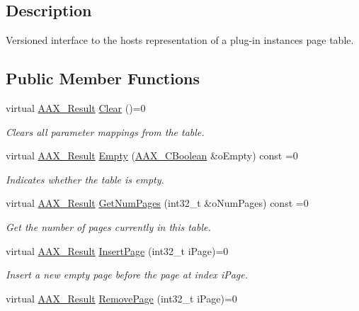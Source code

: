 \subsection{Description}
Versioned interface to the host\textquotesingle{}s representation of a plug-\/in instance\textquotesingle{}s page table. \subsection*{Public Member Functions}
\begin{DoxyCompactItemize}
\item 
virtual \mbox{\hyperlink{a00392_a4d8f69a697df7f70c3a8e9b8ee130d2f}{A\+A\+X\+\_\+\+Result}} \mbox{\hyperlink{a01725_a664fd7f2edd4f258f258541c85cf3a30}{Clear}} ()=0
\begin{DoxyCompactList}\small\item\em Clears all parameter mappings from the table. \end{DoxyCompactList}\item 
virtual \mbox{\hyperlink{a00392_a4d8f69a697df7f70c3a8e9b8ee130d2f}{A\+A\+X\+\_\+\+Result}} \mbox{\hyperlink{a01725_ac76672810be58fb013c193ba50170f53}{Empty}} (\mbox{\hyperlink{a00392_aa216506530f1d19a2965931ced2b274b}{A\+A\+X\+\_\+\+C\+Boolean}} \&o\+Empty) const =0
\begin{DoxyCompactList}\small\item\em Indicates whether the table is empty. \end{DoxyCompactList}\item 
virtual \mbox{\hyperlink{a00392_a4d8f69a697df7f70c3a8e9b8ee130d2f}{A\+A\+X\+\_\+\+Result}} \mbox{\hyperlink{a01725_a8c86b0cfe2d9cfe8b745c09ccf2d8619}{Get\+Num\+Pages}} (int32\+\_\+t \&o\+Num\+Pages) const =0
\begin{DoxyCompactList}\small\item\em Get the number of pages currently in this table. \end{DoxyCompactList}\item 
virtual \mbox{\hyperlink{a00392_a4d8f69a697df7f70c3a8e9b8ee130d2f}{A\+A\+X\+\_\+\+Result}} \mbox{\hyperlink{a01725_aed3706e4e59c9cf58603db7d06888c81}{Insert\+Page}} (int32\+\_\+t i\+Page)=0
\begin{DoxyCompactList}\small\item\em Insert a new empty page before the page at index {\ttfamily i\+Page}. \end{DoxyCompactList}\item 
virtual \mbox{\hyperlink{a00392_a4d8f69a697df7f70c3a8e9b8ee130d2f}{A\+A\+X\+\_\+\+Result}} \mbox{\hyperlink{a01725_a111b8371211623bf0c73e6fe8e77c82c}{Remove\+Page}} (int32\+\_\+t i\+Page)=0

\end{DoxyCompactItemize}
